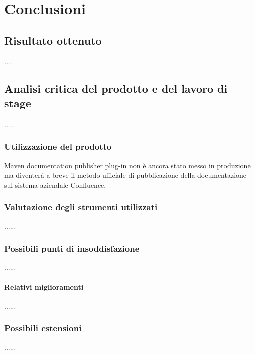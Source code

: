 
\chapter{Conclusioni}
\label{cap:conclusioni}

\section{Risultato ottenuto}
....

\section{Analisi critica del prodotto e del lavoro di stage}
......


\subsection{Utilizzazione del prodotto} %
Maven documentation publisher plug-in non è ancora stato messo in produzione ma diventerà a breve il metodo ufficiale di pubblicazione della documentazione sul sistema aziendale Confluence.


\subsection{Valutazione degli strumenti utilizzati}
......

\subsection{Possibili punti di insoddisfazione}
......

\subsubsection{Relativi miglioramenti}
......

\subsection{Possibili estensioni}
......